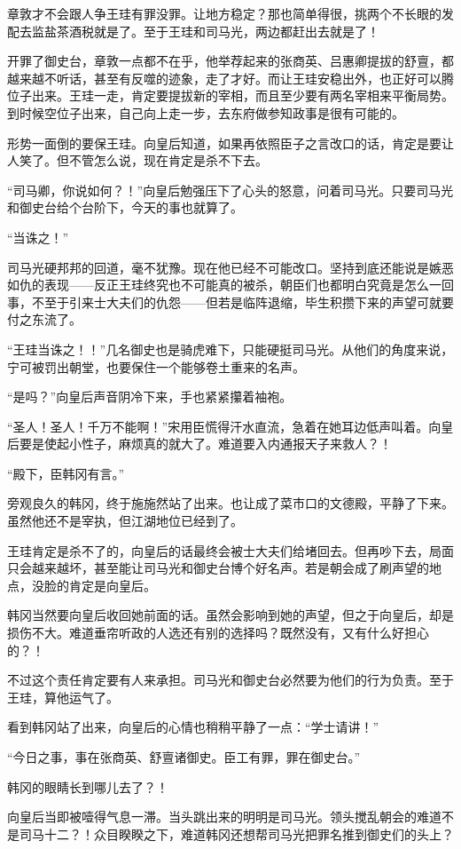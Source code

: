 章敦才不会跟人争王珪有罪没罪。让地方稳定？那也简单得很，挑两个不长眼的发配去监盐茶酒税就是了。至于王珪和司马光，两边都赶出去就是了！

开罪了御史台，章敦一点都不在乎，他举荐起来的张商英、吕惠卿提拔的舒亶，都越来越不听话，甚至有反噬的迹象，走了才好。而让王珪安稳出外，也正好可以腾位子出来。王珪一走，肯定要提拔新的宰相，而且至少要有两名宰相来平衡局势。到时候空位子出来，自己向上走一步，去东府做参知政事是很有可能的。

形势一面倒的要保王珪。向皇后知道，如果再依照臣子之言改口的话，肯定是要让人笑了。但不管怎么说，现在肯定是杀不下去。

“司马卿，你说如何？！”向皇后勉强压下了心头的怒意，问着司马光。只要司马光和御史台给个台阶下，今天的事也就算了。

“当诛之！”

司马光硬邦邦的回道，毫不犹豫。现在他已经不可能改口。坚持到底还能说是嫉恶如仇的表现——反正王珪终究也不可能真的被杀，朝臣们也都明白究竟是怎么一回事，不至于引来士大夫们的仇怨——但若是临阵退缩，毕生积攒下来的声望可就要付之东流了。

“王珪当诛之！！”几名御史也是骑虎难下，只能硬挺司马光。从他们的角度来说，宁可被罚出朝堂，也要保住一个能够卷土重来的名声。

“是吗？”向皇后声音阴冷下来，手也紧紧攥着袖袍。

“圣人！圣人！千万不能啊！”宋用臣慌得汗水直流，急着在她耳边低声叫着。向皇后要是使起小性子，麻烦真的就大了。难道要入内通报天子来救人？！

“殿下，臣韩冈有言。”

旁观良久的韩冈，终于施施然站了出来。也让成了菜市口的文德殿，平静了下来。虽然他还不是宰执，但江湖地位已经到了。

王珪肯定是杀不了的，向皇后的话最终会被士大夫们给堵回去。但再吵下去，局面只会越来越坏，甚至能让司马光和御史台博个好名声。若是朝会成了刷声望的地点，没脸的肯定是向皇后。

韩冈当然要向皇后收回她前面的话。虽然会影响到她的声望，但之于向皇后，却是损伤不大。难道垂帘听政的人选还有别的选择吗？既然没有，又有什么好担心的？！

不过这个责任肯定要有人来承担。司马光和御史台必然要为他们的行为负责。至于王珪，算他运气了。

看到韩冈站了出来，向皇后的心情也稍稍平静了一点：“学士请讲！”

“今日之事，事在张商英、舒亶诸御史。臣工有罪，罪在御史台。”

韩冈的眼睛长到哪儿去了？！

向皇后当即被噎得气息一滞。当头跳出来的明明是司马光。领头搅乱朝会的难道不是司马十二？！众目睽睽之下，难道韩冈还想帮司马光把罪名推到御史们的头上？

